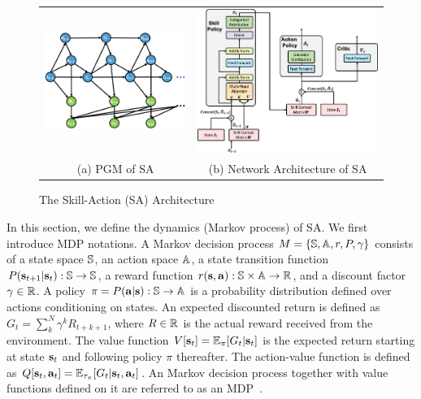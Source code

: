 \begin{figure}[thb]
  \centering
  \begin{tabular}{cc}
    \includegraphics[width=0.45\linewidth]{./Part1/figures/doe.png}&
                                                              \includegraphics[width=0.45\linewidth]{./Part1/figures/sa_attn_net.png}\\
    {\small (a) PGM of SA}&
                            {\small (b) Network
                            Architecture of SA}\\
   
  \end{tabular}
  \caption{\label{fig:sa_net} The Skill-Action (SA) Architecture}
\end{figure}

In this section, we define the dynamics (Markov process) of SA.
We first introduce MDP notations. A Markov decision process
$M=\{{\mathbb{S}},{\mathbb{A}},r,P,\gamma\}$ consists of a state space ${\mathbb{S}}$, an
action space ${\mathbb{A}}$, a state transition function
$P({\mathbf{s}}_{t+1}|{\mathbf{s}}_t): {\mathbb{S}}\rightarrow{\mathbb{S}}$, a reward function
$r({\mathbf{s}},{\mathbf{a}}):{\mathbb{S}}\times{\mathbb{A}}\rightarrow{\mathbb{R}}$, and a discount factor
$\gamma\in{\mathbb{R}}$. A policy $\pi=P({\mathbf{a}}|{\mathbf{s}}):{\mathbb{S}}\rightarrow {\mathbb{A}}$ is
a probability distribution defined over actions conditioning on
states. An expected discounted return is defined as $G_t =
\sum_k^N\gamma^kR_{t+k+1}$, where $R\in{\mathbb{R}}$ is the actual reward
received from the environment. The value function
$V[{\mathbf{s}}_t]=\mathbb{E}_{\pi}[G_t|{\mathbf{s}}_t]$ is the expected return starting
at state ${\mathbf{s}}_t$ and following policy $\pi$ thereafter. The
action-value function is defined as $Q[{\mathbf{s}}_t,{\mathbf{a}}_t]=
\mathbb{E}_{\tau_\pi}[G_t|{\mathbf{s}}_t,{\mathbf{a}}_t]$. An Markov decision process
together with value functions defined on it are referred to as an
MDP~\cite{puterman2014markov}.

